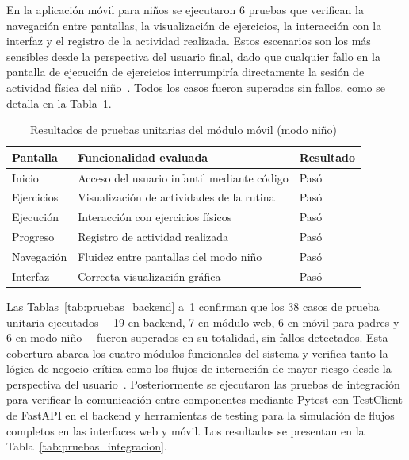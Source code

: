 				En la aplicación móvil para niños se ejecutaron 6 pruebas que verifican la navegación entre pantallas, la visualización de ejercicios, la interacción con la interfaz y el registro de la actividad realizada. Estos escenarios son los más sensibles desde la perspectiva del usuario final, dado que cualquier fallo en la pantalla de ejecución de ejercicios interrumpiría directamente la sesión de actividad física del niño~\cite{Hourcade2015}. Todos los casos fueron superados sin fallos, como se detalla en la Tabla~\ref{tab:pruebas_movil_ninos}.
				
				\begin{table}[H]
					\centering\small
					\caption{Resultados de pruebas unitarias del módulo móvil (modo niño)}
					\label{tab:pruebas_movil_ninos}
					\begin{tabular}{p{3cm}p{8cm}p{2.5cm}}
						\hline
						\textbf{Pantalla} & \textbf{Funcionalidad evaluada} & \textbf{Resultado}\\
						\hline
						Inicio & Acceso del usuario infantil mediante código & Pasó\\
						Ejercicios & Visualización de actividades de la rutina & Pasó\\
						Ejecución & Interacción con ejercicios físicos & Pasó\\
						Progreso & Registro de actividad realizada & Pasó\\
						Navegación & Fluidez entre pantallas del modo niño & Pasó\\
						Interfaz & Correcta visualización gráfica & Pasó\\
						\hline
					\end{tabular}
				\end{table}
				\tblnote
				
				Las Tablas~\ref{tab:pruebas_backend} a~\ref{tab:pruebas_movil_ninos} confirman que los 38 casos de prueba unitaria ejecutados ---19 en backend, 7 en módulo web, 6 en móvil para padres y 6 en modo niño--- fueron superados en su totalidad, sin fallos detectados. Esta cobertura abarca los cuatro módulos funcionales del sistema y verifica tanto la lógica de negocio crítica como los flujos de interacción de mayor riesgo desde la perspectiva del usuario~\cite{GuerreroUlloa2024,Fowler2002}. Posteriormente se ejecutaron las pruebas de integración para verificar la comunicación entre componentes mediante Pytest con TestClient de FastAPI en el backend y herramientas de testing para la simulación de flujos completos en las interfaces web y móvil. Los resultados se presentan en la Tabla~\ref{tab:pruebas_integracion}.
				

